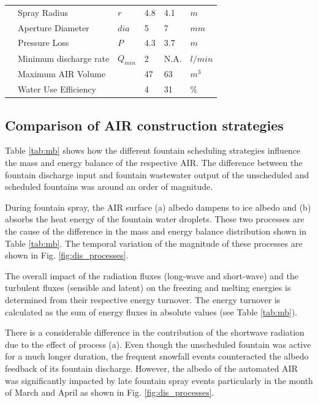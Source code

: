 \documentclass[tc, manuscript]{copernicus}
\begin{document}
\begin{table}
\begin{tabular}{@{}|llllll|@{}}
                           & Spray Radius                    &  $r$            & 4.8           & 4.1           & $m$ \\
		\multicolumn{1}{|l|}{} & Aperture Diameter               &  $dia$          & 5             & 7             & $mm$ \\
		\multicolumn{1}{|l|}{} & Pressure Loss                   &  $P$            & 4.3           & 3.7           & $m$ \\
		\multicolumn{1}{|l|}{} & Minimum discharge rate          &  $Q_{min}$      & 2           & N.A.          & $l/min$ \\\midrule
		\multicolumn{1}{|l|}{\multirow{2}{*}{\rotatebox[origin=c]{90}{AIR}}}

		                       & Maximum AIR Volume              &                 & 47            & 63            & $m^{3}$ \\
		\multicolumn{1}{|l|}{} & Water Use Efficiency            &                 & 4             & 31            & \% \\\midrule
	\end{tabular}
\end{table}

\subsection{Comparison of AIR construction strategies}

Table \ref{tab:mb} shows how the different fountain scheduling strategies influence the mass and energy balance
of the respective AIR. The difference between the fountain discharge input and fountain wastewater output of the
unscheduled and scheduled fountains was around an order of magnitude. 

During fountain spray, the AIR surface (a) albedo dampens to ice albedo and (b) absorbs the heat energy of the
fountain water droplets. These two processes are the cause of the difference in the mass and energy balance
distribution shown in Table \ref{tab:mb}. The temporal variation of the magnitude of these processes are shown
in Fig. \ref{fig:dis_processes}.

The overall impact of the radiation fluxes (long-wave and short-wave) and the turbulent fluxes (sensible and
latent) on the freezing and melting energies is determined from their respective energy turnover. The energy
turnover is calculated as the sum of energy fluxes in absolute values (see Table \ref{tab:mb}). 

There is a considerable difference in the contribution of the shortwave radiation due to the effect of process
(a). Even though the unscheduled fountain was active for a much longer duration, the frequent snowfall events
counteracted the albedo feedback of its fountain discharge. However, the albedo of the automated AIR was
significantly impacted by late fountain spray events particularly in the month of March and April as shown in
Fig. \ref{fig:dis_processes}.
\end{document}
